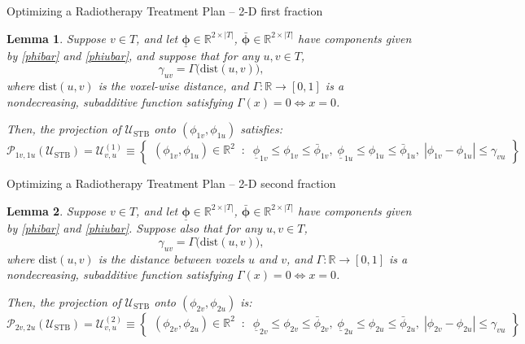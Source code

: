 \documentclass[11pt]{beamer}
\newcommand{\stb}{\mathcal{U}_{\text{STB}}}
\newtheorem{customlemma}{Lemma}
\begin{document}
\begin{frame}{Optimizing a Radiotherapy Treatment Plan – 2-D first fraction}
    \tiny{
        \begin{customlemma}
            Suppose \( v \in T \), and let \( \underline{\bm{\phi}} \in \mathbb{R}^{2 \times |T|} \), \( \bar{\bm{\phi}} \in \mathbb{R}^{2 \times |T|} \) have components given by \eqref{phibar} and \eqref{phiubar}, and suppose that for any \( u, v \in T \),
            \[
            \gamma_{uv} = \Gamma\big(\text{dist}(u, v)\big),
            \]
            where \( \text{dist}(u, v) \) is the voxel-wise distance, and \( \Gamma : \mathbb{R} \to [0, 1] \) is a nondecreasing, subadditive function satisfying \( \Gamma(x) = 0 \iff x = 0 \).
            
            Then, the projection of \( \stb \) onto \( (\phi_{1v}, \phi_{1u}) \) satisfies:
            \[
            \mathcal{P}_{1v,1u}(\stb) = \mathcal{U}_{v,u}^{(1)} \equiv 
            \left\{
            \begin{array}{l}
            (\phi_{1v}, \phi_{1u}) \in \mathbb{R}^2 \;\;:\;\;
            \underline{\phi}_{1v} \le \phi_{1v} \le \bar{\phi}_{1v}, \;
            \underline{\phi}_{1u} \le \phi_{1u} \le \bar{\phi}_{1u}, \;
            |\phi_{1v} - \phi_{1u}| \le \gamma_{vu}
            \end{array}
            \right\}
            \]
            \end{customlemma}
    }
\end{frame}

\begin{frame}{Optimizing a Radiotherapy Treatment Plan – 2-D second fraction}
    \tiny{
    \begin{customlemma}
    Suppose \( v \in T \), and let \( \underline{\bm{\phi}} \in \mathbb{R}^{2 \times |T|} \), \( \bar{\bm{\phi}} \in \mathbb{R}^{2 \times |T|} \) have components given by \eqref{phibar} and \eqref{phiubar}. Suppose also that for any \( u, v \in T \),
    \[
    \gamma_{uv} = \Gamma\big(\text{dist}(u, v)\big),
    \]
    where \( \text{dist}(u, v) \) is the distance between voxels \( u \) and \( v \), and \( \Gamma : \mathbb{R} \to [0, 1] \) is a nondecreasing, subadditive function satisfying \( \Gamma(x) = 0 \iff x = 0 \).
    
    Then, the projection of \( \stb \) onto \( (\phi_{2v}, \phi_{2u}) \) is:
    \[
    \mathcal{P}_{2v,2u}(\stb) = \mathcal{U}_{v,u}^{(2)} \equiv 
    \left\{
    \begin{array}{l}
    (\phi_{2v}, \phi_{2u}) \in \mathbb{R}^2 \;\;:\;\;
    \underline{\phi}_{2v} \le \phi_{2v} \le \bar{\phi}_{2v}, \;
    \underline{\phi}_{2u} \le \phi_{2u} \le \bar{\phi}_{2u}, \;
    |\phi_{2v} - \phi_{2u}| \le \gamma_{vu}
    \end{array}
    \right\}
    \]
    \end{customlemma}
    }
    \end{frame}
\end{document}
